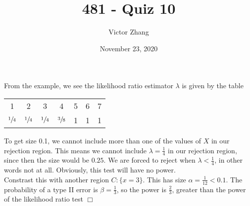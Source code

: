 \documentclass{article}
\title{481 - Quiz 10}
\author{Victor Zhang}
\date{November 23, 2020}
\begin{document}
\maketitle

\section{}
From the example, we see the likelihood ratio estimator $\lambda$ is given by the table
\begin{center}\begin{tabular}{ c c c c c c c }
     1 & 2 & 3 & 4 & 5 & 6 & 7 \\
     \cline{1-7}
     $\sfrac{1}{4}$ & $\sfrac{1}{4}$ & $\sfrac{1}{4}$ & $\sfrac{3}{8}$ & 1 & 1 & 1 \\
\end{tabular}\end{center}
To get size 0.1, we cannot include more than one of the values of $X$ in our rejection region. This means we cannot include $\lambda = \frac{1}{4}$ in our rejection region, since then the size would be $0.25$. We are forced to reject when $\lambda < \frac{1}{4}$, in other words not at all. Obviously, this test will have no power.\\
Constrast this with another region $C : \{x = 3\}$. This has size $\alpha = \frac{1}{12} < 0.1$. The probability of a type II error is $\beta = \frac{1}{3}$, so the power is $\frac{2}{3}$, greater than the power of the likelihood ratio test $\Box$
\end{document}
